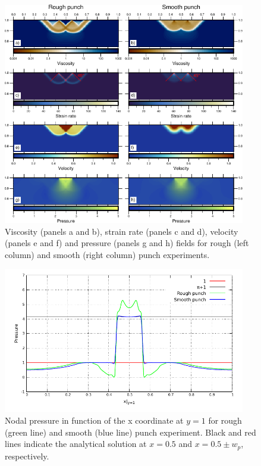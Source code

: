\documentclass[hidelinks,11pt,a4paper]{article}
\begin{document}
\begin{figure}
\centering
\noindent\includegraphics[width=400px]{./Figures/Indenter.pdf}
\caption{Viscosity (panels a and b), strain rate (panels c and d), velocity (panels e and f) and pressure (panels g and h) fields for rough (left column) and smooth (right column) punch experiments.}
\label{fig:indenter}
\end{figure}

\begin{figure}
\centering
\noindent\includegraphics[width=400px]{./Figures/Smooth_Rough.pdf}
\caption{Nodal pressure in function of the x coordinate at $y=1$ for rough (green line) and smooth (blue line) punch experiment. Black and red lines indicate the analytical solution at $x=0.5$ and $x=0.5 \pm w_p$, respectively.}
\label{fig:smooth_p}
\end{figure}
\end{document}
